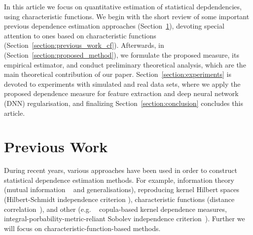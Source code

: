 \documentclass{article}
\begin{document}
In this article we focus on quantitative estimation of statistical depdendencies, using characteristic functions. We begin with the short review of some important previous dependence estimation approaches (Section~\ref{section:previous_work}), devoting special attention to ones based on characteristic functions (Section~\ref{section:previous_work_cf}). Afterwards, in (Section~\ref{section:proposed_method}), we formulate the proposed measure, its empirical estimator, and conduct preliminary theoretical analysis, which are the main theoretical contribution of our paper. Section~\ref{section:experiments} is devoted to experiments with simulated and real data sets, where we apply the proposed dependence measure for feature extraction and deep neural network (DNN) regularisation,  and finalizing Section~\ref{section:conclusion} concludes this article.


\section{Previous Work}
\label{section:previous_work}
During recent years, various approaches have been used in order to construct statistical dependence estimation methods. For example, information theory (mutual information ~\cite{Cover2006} and generalisations), reproducing kernel Hilbert spaces (Hilbert-Schmidt independence criterion \cite{Gretton2005MeasuringSD}), characteristic functions (distance correlation~\cite{Feuerverger, Szekely}), and other (e.g. ~\cite{Pczos2012CopulabasedKD} copula-based kernel dependence measures, integral-porbability-metric-reliant Sobolev independence criterion~\cite{NIPS2019_9147}).
Further we will focus on characteristic-function-based methods. 
\end{document}
